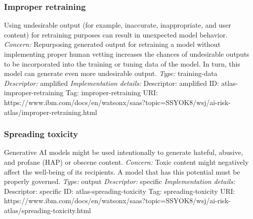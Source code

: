 \documentclass{article}
\begin{document}
\subsubsection*{Improper retraining}
Using undesirable output (for example, inaccurate, inappropriate, and user content) for retraining purposes can result in unexpected model behavior.\newline
\textit{Concern: }Repurposing generated output for retraining a model without implementing proper human vetting increases the chances of undesirable outputs to be incorporated into the training or tuning data of the model. In turn, this model can generate even more undesirable output.\newline\newline
\textit{Type: }training-data\newline
\textit{Descriptor: }amplified \newline\newline
\textit{Implementation details:} \newline
Descriptor: amplified \newline
ID: atlas-improper-retraining \newline
Tag: improper-retraining \newline
URI:  https://www.ibm.com/docs/en/watsonx/saas?topic=SSYOK8/wsj/ai-risk-atlas/improper-retraining.html\newline
\subsubsection*{Spreading toxicity}
Generative AI models might be used intentionally to generate hateful, abusive, and profane (HAP) or obscene content.\newline
\textit{Concern: }Toxic content might negatively affect the well-being of its recipients. A model that has this potential must be properly governed.\newline\newline
\textit{Type: }output\newline
\textit{Descriptor: }specific \newline\newline
\textit{Implementation details:} \newline
Descriptor: specific \newline
ID: atlas-spreading-toxicity \newline
Tag: spreading-toxicity \newline
URI:  https://www.ibm.com/docs/en/watsonx/saas?topic=SSYOK8/wsj/ai-risk-atlas/spreading-toxicity.html\newline
\end{document}
